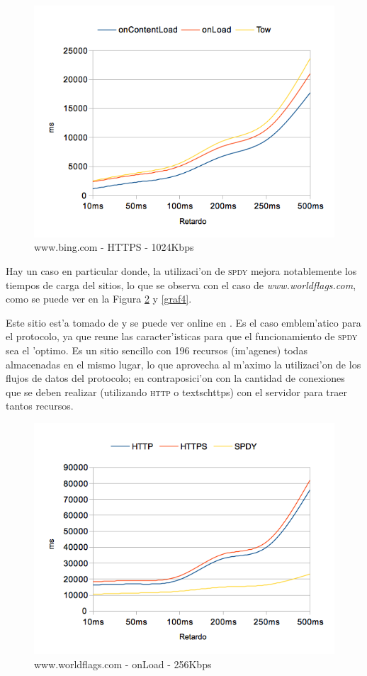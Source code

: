 \documentclass[a4paper,11pt,twocolumn]{article}
\begin{document}
\begin{figure}[h!]
  	\centering
	\includegraphics[scale=0.65]{exp1_2}
	\caption{\small www.bing.com - HTTPS - 1024Kbps}
	\label{graf2}
\end{figure}

Hay un caso en particular donde, la utilizaci'on de \textsc{spdy} mejora notablemente los tiempos de carga del sitios, lo que se observa con el caso de \emph{www.worldflags.com}, como se puede ver en la Figura \ref{graf3} y \ref{graf4}.

Este sitio est'a tomado de \cite{modspdyApache} y se puede ver online en \cite{flags}. Es el caso emblem'atico para el protocolo, ya que reune las caracter'isticas para que el funcionamiento de \textsc{spdy} sea el 'optimo. Es un sitio sencillo con 196 recursos (im'agenes) todas almacenadas en el mismo lugar, lo que aprovecha al m'aximo la utilizaci'on de los flujos de datos del protocolo; en contraposici'on con la cantidad de conexiones que se deben realizar (utilizando \textsc{http} o textsc{https}) con el servidor para traer tantos recursos.

\begin{figure}[h!]
  	\centering
	\includegraphics[scale=0.65]{exp1_3}
	\caption{\small www.worldflags.com - onLoad - 256Kbps}
	\label{graf3}
\end{figure}
\end{document}
